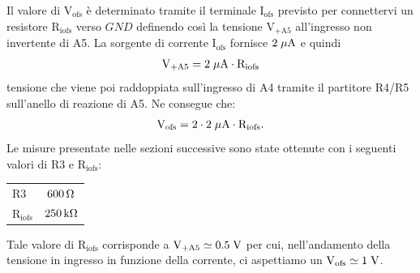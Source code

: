Il valore di $\mathrm{V_{ofs}}$ è determinato tramite il terminale $\mathrm{I_{ofs}}$ previsto per connettervi un resistore $\mathrm{R_{iofs}}$ verso $GND$ definendo cos\`i la tensione $\mathrm{V_{+A5}}$ all'ingresso non invertente di A5. La sorgente di corrente $\mathrm{I_{ofs}}$ fornisce $2\; \mu \rm A$ e quindi
\begin{equation}
\label{eq:V+a5}
\mathrm{V_{+A5} = 2 \; \mu \rm A \cdot R_{iofs}}
\end{equation}
tensione che viene poi raddoppiata sull'ingresso di A4 tramite il partitore R4/R5 sull'anello di reazione di A5. Ne consegue che:
\begin{equation}
\label{eq:Vofs}
\mathrm{V_{ofs} = 2\cdot 2\; \mu \rm A \cdot R_{iofs}}.
\end{equation}
Le misure presentate nelle sezioni successive sono state ottenute con i seguenti valori di R3 e $\mathrm{R_{iofs}}$:
\begin{center}
\begin{tabular}{lc}
\hline
$\mathrm{R3}$ & $600{\rm \, \Omega}$ \\%
$\mathrm{R_{iofs}}$ & $250{\rm \, k\Omega}$\\ 
\hline
\end{tabular}
\end{center}
Tale valore di $\mathrm{R_{iofs}}$ corrisponde a $\mathrm{V_{+A5}\simeq0.5\rm \; V}$ per cui, nell'andamento della tensione in ingresso in funzione della corrente, ci aspettiamo un $\mathrm{V_{ofs}\simeq 1\rm \; V}$.

